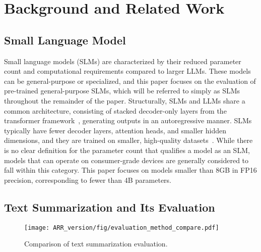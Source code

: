\section{Background and Related Work}
\label{sec:background}




\subsection{Small Language Model}


Small language models (SLMs) are characterized by their reduced parameter count and computational requirements compared to larger LLMs. These models can be general-purpose or specialized, and this paper focuses on the evaluation of pre-trained general-purpose SLMs, which will be referred to simply as SLMs throughout the remainder of the paper. Structurally, SLMs and LLMs share a common architecture, consisting of stacked decoder-only layers from the transformer framework~\cite{attention_all_you_need}, generating outputs in an autoregressive manner. SLMs typically have fewer decoder layers, attention heads, and smaller hidden dimensions, and they are trained on smaller, high-quality datasets~\cite{lu2024smalllanguagemodelssurvey}. While there is no clear definition for the parameter count that qualifies a model as an SLM, models that can operate on consumer-grade devices are generally considered to fall within this category. This paper focuses on models smaller than 8GB in FP16 precision, corresponding to fewer than 4B parameters.




\subsection{Text Summarization and Its Evaluation}


\begin{figure}
    \centering
    \texttt{[image: ARR\_version/fig/evaluation\_method\_compare.pdf]}
    \caption{Comparison of text summarization evaluation. }
    \label{fig:evaluation_compare}
\end{figure}



